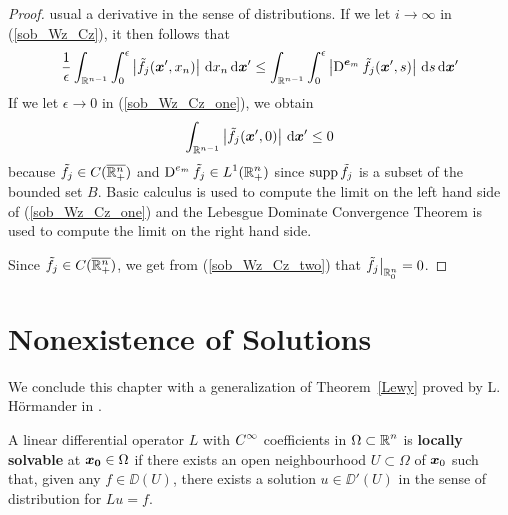 \begin{proof}
usual a derivative in the sense of distributions.  If we let
$i \rightarrow \infty$ in (\ref{sob_Wz_Cz}), it then follows that
\begin{equation} \label{sob_Wz_Cz_one}
\frac{1}{\epsilon} \int_{\mathbb{R}^{n-1}} \int_0^\epsilon
\left| \tilde{f}_j({\bm{x}}', x_n) \right| \,\mathrm{d}{x_n} \,\mathrm{d}{{\bm{x}}'}
\leq \int_{\mathbb{R}^{n-1}} \int_0^\epsilon
\left| \operatorname{D}^{{\bm{e}}_m}\tilde{f}_j({\bm{x}}',s) \right| \,\mathrm{d}{s} \,\mathrm{d}{{\bm{x}}'}
\end{equation}
If we let $\epsilon \rightarrow 0$ in (\ref{sob_Wz_Cz_one}),
we obtain 
\begin{equation} \label{sob_Wz_Cz_two}
\int_{\mathbb{R}^{n-1}} \left| \tilde{f}_j({\bm{x}}', 0) \right| \,\mathrm{d}{{\bm{x}}'}
\leq 0
\end{equation}
because $\displaystyle \tilde{f}_j \in C(\overline{\mathbb{R}^n_+})$ and
$\displaystyle \operatorname{D}^{e_m}\tilde{f}_j \in L^1(\mathbb{R}^n_+)$ since
$\operatorname{supp} \tilde{f}_j$ is a subset of the bounded set $B$.  Basic
calculus is used to compute the limit on the left hand side of 
(\ref{sob_Wz_Cz_one}) and the Lebesgue Dominate Convergence Theorem
is used to compute the limit on the right hand side.

Since $\displaystyle \tilde{f}_j \in C(\overline{\mathbb{R}^n_+})$, we get from
(\ref{sob_Wz_Cz_two}) that $\displaystyle \tilde{f}_j\big|_{\mathbb{R}^n_0} = 0$.
\end{proof}

\section{Nonexistence of Solutions}

We conclude this chapter with a generalization of Theorem~\ref{Lewy}
proved by L. Hörmander in \cite{Horm}.

\begin{defn}
A linear differential operator $L$ with $\displaystyle C^\infty$ coefficients in
$\displaystyle \Omega \subset \mathbb{R}^n$ is
{\bfseries locally solvable} at 
${\bm{x_0}} \in \Omega$ if there exists an open neighbourhood
$U \subset \Omega$ of ${\bm{x}}_0$ such that, given any
$f\in \DD(U)$, there exists a solution $u \in \DD'(U)$ in the sense of
distribution for $Lu = f$.
\end{defn}

